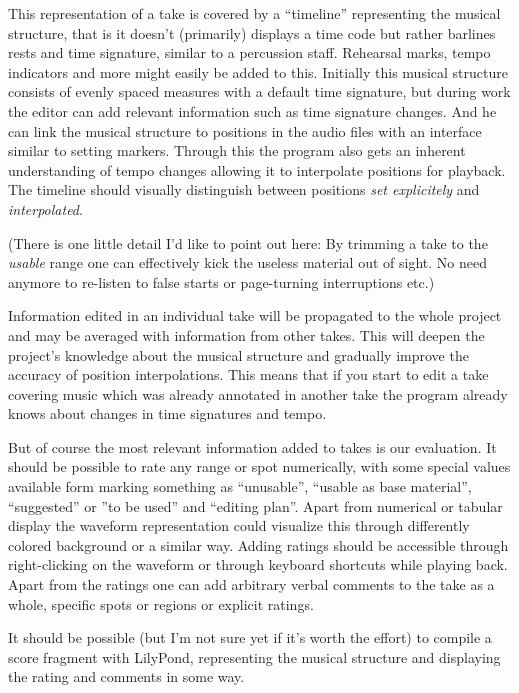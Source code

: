 \documentclass[11pt,a4paper]{article}
\begin{document}
This representation of a take is covered by a “timeline” representing the musical structure, that is it doesn't (primarily) displays a time code but rather barlines rests and time signature, similar to a percussion staff.
Rehearsal marks, tempo indicators and more might easily be added to this.
Initially this musical structure consists of evenly spaced measures with a default time signature, but during work the editor can add relevant information such as time signature changes.
And he can link the musical structure to positions in the audio files with an interface similar to setting markers.
Through this the program also gets an inherent understanding of tempo changes allowing it to interpolate positions for playback.
The timeline should visually distinguish between positions \emph{set explicitely} and \emph{interpolated}.

(There is one little detail I'd like to point out here: By trimming a take to the \emph{usable} range one can effectively kick the useless material out of sight.
No need anymore to re-listen to false starts or page-turning interruptions etc.)

Information edited in an individual take will be propagated to the whole project and may be averaged with information from other takes.
This will deepen the project's knowledge about the musical structure and gradually improve the accuracy of position interpolations.
This means that if you start to edit a take covering music which was already annotated in another take the program already knows about changes in time signatures and tempo.

But of course the most relevant information added to takes is our evaluation.
It should be possible to rate any range or spot numerically, with some special values available form marking something as “unusable”, “usable as base material”, “suggested” or ”to be used” and “editing plan”.
Apart from numerical or tabular display the waveform representation could visualize this through differently colored background or a similar way.
Adding ratings should be accessible through right-clicking on the waveform or through keyboard shortcuts while playing back.
Apart from the ratings one can add arbitrary verbal comments to the take as a whole, specific spots or regions or explicit ratings.

It should be possible (but I'm not sure yet if it's worth the effort) to compile a score fragment with LilyPond, representing the musical structure and displaying the rating and comments in some way.
\end{document}
